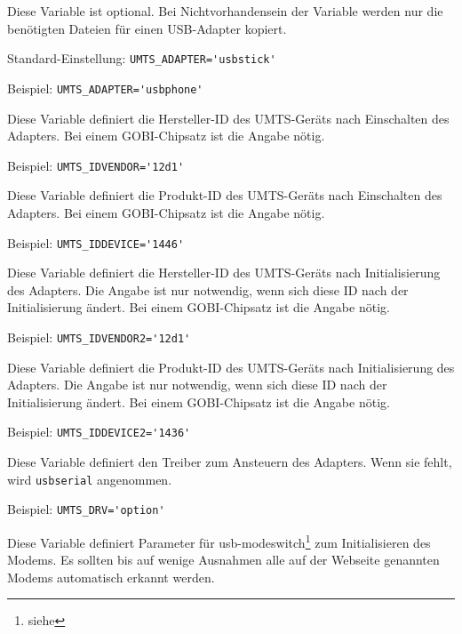 \begin{description}
Diese Variable ist optional. Bei Nichtvorhandensein der Variable werden nur die
benötigten Dateien für einen USB-Adapter kopiert.

Standard-Einstellung: \verb+UMTS_ADAPTER='usbstick'+

Beispiel: \verb+UMTS_ADAPTER='usbphone'+



Diese Variable definiert die Hersteller-ID des UMTS-Geräts nach Einschalten des
Adapters. Bei einem GOBI-Chipsatz ist die Angabe nötig.

Beispiel: \verb+UMTS_IDVENDOR='12d1'+


Diese Variable definiert die Produkt-ID des UMTS-Geräts nach Einschalten des
Adapters. Bei einem GOBI-Chipsatz ist die Angabe nötig.

Beispiel: \verb+UMTS_IDDEVICE='1446'+


Diese Variable definiert die Hersteller-ID des UMTS-Geräts nach Initialisierung
des Adapters. Die Angabe ist nur notwendig, wenn sich diese ID nach der
Initialisierung ändert. Bei einem GOBI-Chipsatz ist die Angabe nötig.

Beispiel: \verb+UMTS_IDVENDOR2='12d1'+


Diese Variable definiert die Produkt-ID des UMTS-Geräts nach Initialisierung
des Adapters. Die Angabe ist nur notwendig, wenn sich diese ID nach der
Initialisierung ändert. Bei einem GOBI-Chipsatz ist die Angabe nötig.

Beispiel: \verb+UMTS_IDDEVICE2='1436'+


Diese Variable definiert den Treiber zum Ansteuern des Adapters. Wenn sie fehlt,
wird \verb+usbserial+ angenommen.

Beispiel: \verb+UMTS_DRV='option'+


Diese Variable definiert Parameter für usb-modeswitch\footnote{siehe
} zum Initialisieren des
Modems. Es sollten bis auf wenige Ausnahmen alle auf der Webseite genannten
Modems automatisch erkannt werden.


\end{description}
